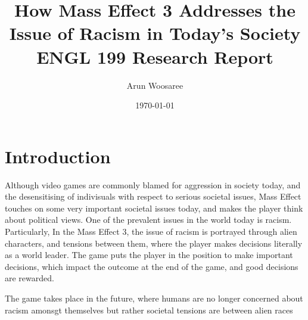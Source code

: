 \documentclass{IEEEtran}
\title{How Mass Effect 3 Addresses the Issue of Racism in Today's Society  \\
\vspace{.25cm}\large ENGL 199 Research Report \vspace{-.5cm}}
\author{\LARGE Arun Woosaree}
\date{\today}
\begin{document}
\maketitle %

\section{Introduction}

Although video games are commonly blamed for aggression in society today,
and the desensitising of indivisuals with respect to serious societal issues, Mass Effect  touches on some very important societal issues today, and
makes the player think about political views. One of the prevalent issues in the world today is
racism. Particularly, In the Mass Effect 3, the issue of racism is portrayed through alien characters, and
tensions between them, where the player makes decisions literally as a world leader. The game puts the player in the position to
make important decisions, which impact the outcome at the end of the game, and good decisions are rewarded.

The game takes place in the future, where humans are no longer concerned about racism amonsgt themselves but rather societal
tensions are between alien races
\end{document}
